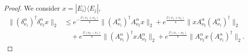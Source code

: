 \documentclass[11pt]{amsart}
\newcommand{\nn}{\nonumber}
\newcommand{\1}{\mathbbm{1}}
\newcommand{\red}[1]{\textcolor{red}{#1}}
\theoremstyle{plain}
\theoremstyle{definition}
\theoremstyle{remark}
\numberwithin{equation}{section}
\begin{document}
 \begin{proof}
We consider $x=|E_i\rangle\langle E_j|$,
\begin{align}
\label{eq:deltaTriangle}
\nn\|(\delta^\alpha_{\nu_1})^\dagger\delta^\alpha_{\nu_2}x\|_2&\le \!e^{-\frac{\beta(\nu_1+\nu_2)}{4}}\|(A^\alpha_{\nu_1} )^\dagger A^\alpha_{\nu_2}x\|_2+e^{\frac{\beta(\nu_1+\nu_2)}{4}}\|xA^\alpha_{\nu_2}(A^\alpha_{\nu_1})^\dagger\|_2\\
&\quad +e^{\frac{\beta(\nu_2-\nu_1)}{4}}\|(A^\alpha_{\nu_1})^\dagger x A^\alpha_{\nu_2}\|_2+e^{\frac{\beta(\nu_1-\nu_2)}{4}}\|A^\alpha_{\nu_2}x(A^\alpha_{\nu_1})^\dagger\|_2.
\end{align}

\end{proof}
\end{document}
